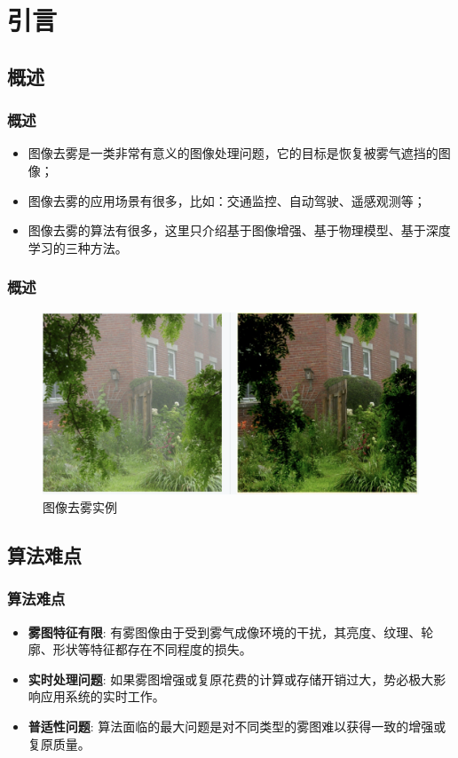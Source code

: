 
    \section{引言}

    \subsection{概述}
    \begin{frame}
      \frametitle{概述}
      \begin{itemize}
        \item 图像去雾是一类非常有意义的图像处理问题，它的目标是恢复被雾气遮挡的图像；
        \item 图像去雾的应用场景有很多，比如：交通监控、自动驾驶、遥感观测等；
        \item 图像去雾的算法有很多，这里只介绍基于图像增强、基于物理模型、基于深度学习的三种方法。
      \end{itemize}
    \end{frame}

    \begin{frame}
      \frametitle{概述}
      \begin{figure}
        \centering
        \includegraphics[width=\textwidth]{figures/pic1.png}
        \caption{图像去雾实例}
      \end{figure}
    \end{frame}

    \subsection{算法难点}
    \begin{frame}
      \frametitle{算法难点}
      \begin{itemize}
        \item \textbf{雾图特征有限}: 有雾图像由于受到雾气成像环境的干扰，其亮度、纹理、轮廓、形状等特征都存在不同程度的损失。
        \item \textbf{实时处理问题}: 如果雾图增强或复原花费的计算或存储开销过大，势必极大影响应用系统的实时工作。
        \item \textbf{普适性问题}: 算法面临的最大问题是对不同类型的雾图难以获得一致的增强或复原质量。
      \end{itemize}
    \end{frame}



